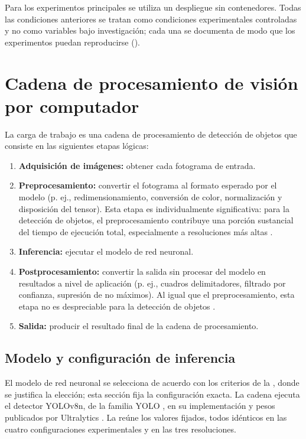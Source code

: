 Para los experimentos principales se utiliza un despliegue sin
contenedores. Todas las condiciones anteriores se tratan como condiciones
experimentales controladas y no como variables bajo investigación; cada una
se documenta de modo que los experimentos puedan reproducirse
().

\section{Cadena de procesamiento de visión por computador}
\label{sec:pipeline}

La carga de trabajo es una cadena de procesamiento de detección de objetos
que consiste en las siguientes etapas lógicas:

\begin{enumerate}
  \item \textbf{Adquisición de imágenes:} obtener cada fotograma de
        entrada.
  \item \textbf{Preprocesamiento:} convertir el fotograma al formato
        esperado por el modelo (p. ej., redimensionamiento, conversión de
        color, normalización y disposición del tensor). Esta etapa es
        individualmente significativa: para la detección de objetos, el
        preprocesamiento contribuye una porción sustancial del tiempo de
        ejecución total, especialmente a resoluciones más altas
        \cite{szegedi2026}.
  \item \textbf{Inferencia:} ejecutar el modelo de red neuronal.
  \item \textbf{Postprocesamiento:} convertir la salida sin procesar del
        modelo en resultados a nivel de aplicación (p. ej., cuadros
        delimitadores, filtrado por confianza, supresión de no máximos). Al
        igual que el preprocesamiento, esta etapa no es despreciable para
        la detección de objetos \cite{szegedi2026}.
  \item \textbf{Salida:} producir el resultado final de la cadena de
        procesamiento.
\end{enumerate}

\subsection{Modelo y configuración de inferencia}
\label{sec:model-configuration}

El modelo de red neuronal se selecciona de acuerdo con los criterios de la
, donde se justifica la elección; esta sección fija la
configuración exacta. La cadena ejecuta el detector YOLOv8n, de la familia
YOLO \cite{redmon2016}, en su implementación y pesos publicados por
Ultralytics \cite{ultralytics2023}. La  reúne
los valores fijados, todos idénticos en las cuatro configuraciones
experimentales y en las tres resoluciones.

